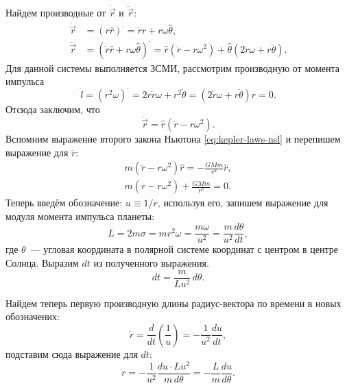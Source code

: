 Найдем производные от $\dot{\vec{r}}$ и $\ddot{\vec{r}}$:
\begin{align}
	\dot{\vec{r}} &= (r \hat{r})^{\cdot} = \dot{r} \hat{r} + r \omega \hat{\theta}, \nonumber\\
	\ddot{\vec{r}} &= (\dot{r} \hat{r} + r \omega \hat{\theta})^{\cdot} = \hat{r} (\ddot{r} - r \omega^2) + \hat{\theta} (2\dot{r}\omega + r \ddot{\theta}). 
\end{align}
Для данной системы выполняется ЗСМИ, рассмотрим производную от момента импульса
\begin{equation*}
	\dot{l} = (r^2 \omega)^{\cdot} = 2 r \dot{r} \omega + r^2 \ddot{\theta} = (2\dot{r}\omega + r \ddot{\theta})r = 0.
\end{equation*}
Отсюда заключим, что
\begin{equation}
	\ddot{\vec{r}} = \hat{r} (\ddot{r} - r \omega^2).
\end{equation}
Вспомним выражение второго закона Ньютона \eqref{eq:kepler-laws-nsl} и перепишем выражение для $\ddot{r}$:
\begin{gather}
	m (\ddot{r} - r \omega^2) \hat{r} = - \frac{GMm}{r^2} \hat{r}, \nonumber\\
	m (\ddot{r} - r \omega^2) + \frac{GMm}{r^2} = 0.
	\label{eq:kepler-laws-difeq}
\end{gather}
Теперь введём обозначение: $u \equiv 1/r$, используя его, запишем выражение для модуля момента импульса планеты:
\begin{equation*}
    L = 2 m \sigma = m r^2 \omega = \frac{m \omega}{u^2} = \frac{m}{u^2} \frac{d \theta}{d t},
\end{equation*}
где $\theta$~--- угловая координата в полярной системе координат с центром в центре Солнца.
Выразим $dt$ из полученного выражения.
\begin{equation*}
    dt = \frac{m}{L u^2} \,d \theta.
\end{equation*}

Найдем теперь первую производную длины радиус-вектора по времени в новых обозначених:
\begin{equation*}
    \dot{r} = \frac{d}{d t} \left( \frac{1}{u} \right) = - \frac{1}{u^2} \frac{du}{dt},
\end{equation*}
подставим сюда выражение для $dt$:
\begin{equation*}
    \dot{r} = - \frac{1}{u^2} \frac{du \cdot L u^2}{m \,d \theta} = - \frac{L}{m} \frac{d u}{d \theta}.
\end{equation*}

